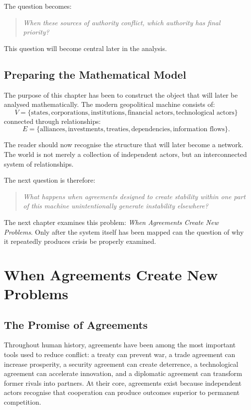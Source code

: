 \documentclass[11pt,openany]{book}
\theoremstyle{plain}
\theoremstyle{definition}
\begin{document}
The question becomes:
\begin{quote}
\textit{When these sources of authority conflict, which authority has final priority?}
\end{quote}

This question will become central later in the analysis.


\section*{Preparing the Mathematical Model}

The purpose of this chapter has been to construct the object that will later be analysed mathematically. The modern geopolitical machine consists of:
\[
V = \{ \text{states}, \text{corporations}, \text{institutions}, \text{financial actors}, \text{technological actors} \}
\]
connected through relationships:
\[
E = \{ \text{alliances}, \text{investments}, \text{treaties}, \text{dependencies}, \text{information flows} \}.
\]

The reader should now recognise the structure that will later become a network. The world is not merely a collection of independent actors, but an interconnected system of relationships. 

The next question is therefore:
\begin{quote}
\textit{What happens when agreements designed to create stability within one part of this machine unintentionally generate instability elsewhere?}
\end{quote}

The next chapter examines this problem: \textit{When Agreements Create New Problems}. Only after the system itself has been mapped can the question of why it repeatedly produces crisis be properly examined.


\chapter{When Agreements Create New Problems}

\section*{The Promise of Agreements}

Throughout human history, agreements have been among the most important tools used to reduce conflict: a treaty can prevent war, a trade agreement can increase prosperity, a security agreement can create deterrence, a technological agreement can accelerate innovation, and a diplomatic agreement can transform former rivals into partners. At their core, agreements exist because independent actors recognise that cooperation can produce outcomes superior to permanent competition.
\end{document}
